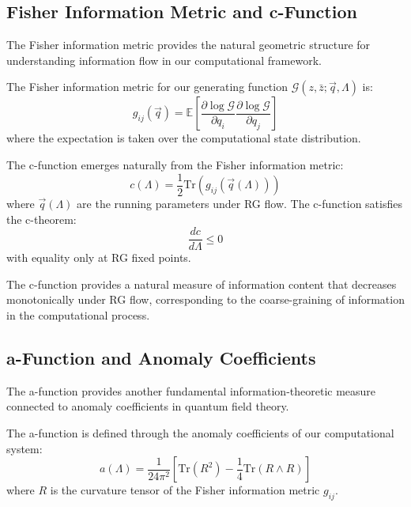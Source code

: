 \subsection{Fisher Information Metric and c-Function}

The Fisher information metric provides the natural geometric structure for understanding information flow in our computational framework.

\begin{definition}
\label{def:fisher-metric}
The Fisher information metric for our generating function $\mathcal{G}(z,\bar{z};\vec{q},\Lambda)$ is:
\[
g_{ij}(\vec{q}) = \mathbb{E}\left[\frac{\partial \log \mathcal{G}}{\partial q_i} \frac{\partial \log \mathcal{G}}{\partial q_j}\right]
\]
where the expectation is taken over the computational state distribution.
\end{definition}

\begin{theorem}
\label{thm:c-function}
The c-function emerges naturally from the Fisher information metric:
\[
c(\Lambda) = \frac{1}{2} \text{Tr}(g_{ij}(\vec{q}(\Lambda)))
\]
where $\vec{q}(\Lambda)$ are the running parameters under RG flow. The c-function satisfies the c-theorem:
\[
\frac{dc}{d\Lambda} \leq 0
\]
with equality only at RG fixed points.
\end{theorem}

The c-function provides a natural measure of information content that decreases monotonically under RG flow, corresponding to the coarse-graining of information in the computational process.

\subsection{a-Function and Anomaly Coefficients}

The a-function provides another fundamental information-theoretic measure connected to anomaly coefficients in quantum field theory.

\begin{definition}[a-Function]
\label{def:a-function}
The a-function is defined through the anomaly coefficients of our computational system:
\[
a(\Lambda) = \frac{1}{24\pi^2} \left[ \text{Tr}(R^2) - \frac{1}{4}\text{Tr}(R \wedge R) \right]
\]
where $R$ is the curvature tensor of the Fisher information metric $g_{ij}$.
\end{definition}

